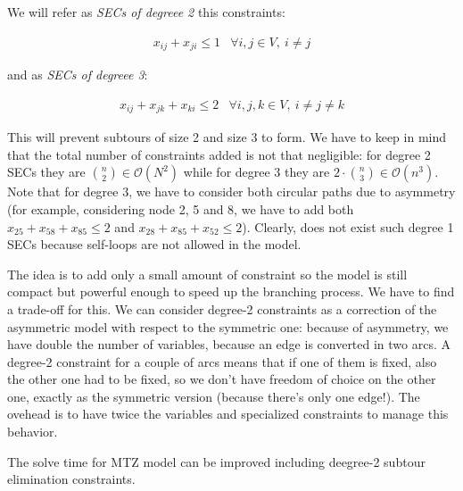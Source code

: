 We will refer as \emph{SECs of degreee 2} this constraints:

\begin{equation*} 
    \begin{array}{lr} 
        x_{ij} + x_{ji} \leq 1 & \forall i, j \in V,\ i \neq j
    \end{array} 
\end{equation*}

and as \emph{SECs of degreee 3}:

\begin{equation*} 
    \begin{array}{lr} 
        x_{ij} + x_{jk} + x_{ki} \leq 2 & \forall i, j, k \in V,\ i \neq j \neq k
    \end{array} 
\end{equation*}

This will prevent subtours of size 2 and size 3 to form. We have to keep in mind
that the total number of constraints added is not that negligible: for degree 2
SECs they are ${n \choose 2} \in \mathcal{O}(N^2)$ while for degree 3 they are
$2 \cdot {n \choose 3} \in \mathcal{O}(n^3)$. Note that for degree 3, we have to
consider both circular paths due to asymmetry (for example, considering node 2,
5 and 8, we have to add both $x_{25} + x_{58} + x_{85} \leq 2$ and $x_{28} +
x_{85} + x_{52} \leq 2$). Clearly, does not exist such degree 1 SECs because
self-loops are not allowed in the model.

The idea is to add only a small amount of constraint so the model is still
compact but powerful enough to speed up the branching process. We have to find a
trade-off for this. We can consider degree-2 constraints as a correction of the
asymmetric model with respect to the symmetric one: because of asymmetry, we
have double the number of variables, because an edge is converted in two arcs.
A degree-2 constraint for a couple of arcs means that if one of them is fixed,
also the other one had to be fixed, so we don't have freedom of choice on the
other one, exactly as the symmetric version (because there's only one edge!).
The ovehead is to have twice the variables and specialized constraints to manage
this behavior.

\begin{claim} 
    The solve time for MTZ model can be improved including deegree-2 subtour
    elimination constraints. 
\end{claim}


